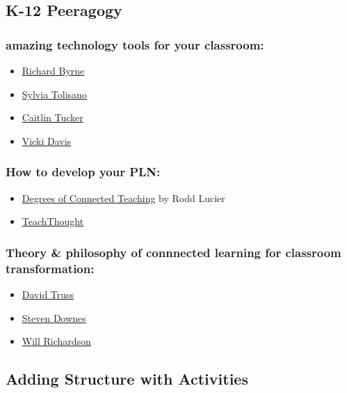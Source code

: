 \subsection{K-12 Peeragogy}

\subsubsection{amazing technology tools for your classroom:}

\begin{itemize}
\item
  \href{http://www.freetech4teachers.com/}{Richard Byrne}
\item
  \href{http://langwitches.org/blog/}{Sylvia Tolisano}
\item
  \href{http://catlintucker.com/2011/11/12-tech-tools-that-will-transform-your-classroom/}{Caitlin
  Tucker}
\item
  \href{http://coolcatteacher.blogspot.ca/}{Vicki Davis}
\end{itemize}
\subsubsection{How to develop your PLN:}

\begin{itemize}
\item
  \href{\%20http://thecleversheep.blogspot.ca/2012/06/seven-degrees-of-connectedness\_06.html}{Degrees
  of Connected Teaching} by Rodd Lucier
\item
  \href{\%20http://thecleversheep.blogspot.ca/2012/06/seven-degrees-of-connectedness\_06.html}{TeachThought}
\end{itemize}
\subsubsection{Theory \& philosophy of connnected learning for classroom
transformation:}

\begin{itemize}
\item
  \href{http://pairadimes.davidtruss.com/}{David Truss}
\item
  \href{http://www.downes.ca/presentation/264}{Steven Downes}
\item
  \href{http://willrichardson.com/}{Will Richardson}
\end{itemize}
\subsection{Adding Structure with Activities}

